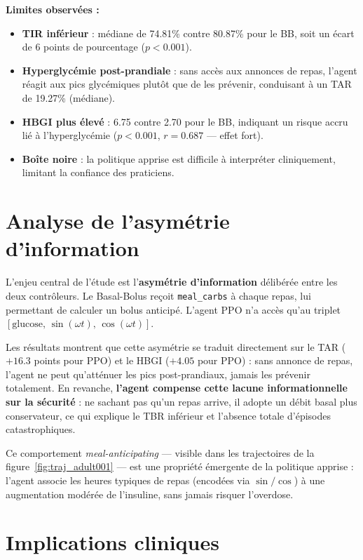 \documentclass[a4paper,12pt]{report}
\begin{document}
\textbf{Limites observées :}
\begin{itemize}
  \item \textbf{TIR inférieur} : médiane de 74.81\% contre 80.87\% pour le BB, soit un écart de 6 points de pourcentage ($p < 0.001$).
  \item \textbf{Hyperglycémie post-prandiale} : sans accès aux annonces de repas, l'agent réagit aux pics glycémiques plutôt que de les prévenir, conduisant à un TAR de 19.27\% (médiane).
  \item \textbf{HBGI plus élevé} : 6.75 contre 2.70 pour le BB, indiquant un risque accru lié à l'hyperglycémie ($p < 0.001$, $r = 0.687$ --- effet fort).
  \item \textbf{Boîte noire} : la politique apprise est difficile à interpréter cliniquement, limitant la confiance des praticiens.
\end{itemize}

\section{Analyse de l'asymétrie d'information}

L'enjeu central de l'étude est l'\textbf{asymétrie d'information} délibérée entre les deux contrôleurs. Le Basal-Bolus reçoit \texttt{meal\_carbs} à chaque repas, lui permettant de calculer un bolus anticipé. L'agent PPO n'a accès qu'au triplet $[\text{glucose},\, \sin(\omega t),\, \cos(\omega t)]$.

Les résultats montrent que cette asymétrie se traduit directement sur le TAR ($+16.3$ points pour PPO) et le HBGI ($+4.05$ pour PPO) : sans annonce de repas, l'agent ne peut qu'atténuer les pics post-prandiaux, jamais les prévenir totalement. En revanche, \textbf{l'agent compense cette lacune informationnelle sur la sécurité} : ne sachant pas qu'un repas arrive, il adopte un débit basal plus conservateur, ce qui explique le TBR inférieur et l'absence totale d'épisodes catastrophiques.

Ce comportement \textit{meal-anticipating} --- visible dans les trajectoires de la figure~\ref{fig:traj_adult001} --- est une propriété émergente de la politique apprise : l'agent associe les heures typiques de repas (encodées via $\sin/\cos$) à une augmentation modérée de l'insuline, sans jamais risquer l'overdose.

\section{Implications cliniques}
\end{document}
